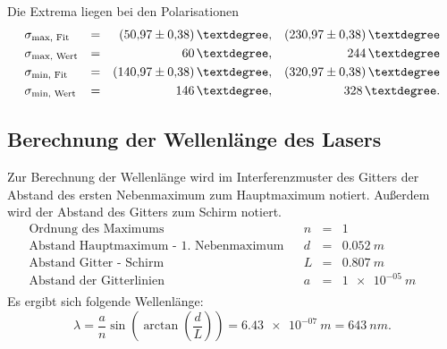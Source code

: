 %
Die Extrema liegen bei den Polarisationen
\begin{align*}
  &\sigma_{\text{max, Fit}} &=&& \SI{50.97 \pm 0.38}{°},   && \SI{230.97 \pm 0.38}{°} \\
  &\sigma_{\text{max, Wert}} &=&& \SI{ 60 }{°},                          && \SI{ 244 }{°} \\
  &\sigma_{\text{min, Fit}} &=&& \SI{140.97 \pm 0.38}{°},  && \SI{320.97 \pm 0.38}{°} \\
  &\sigma_{\text{min, Wert}} &=&& \SI{ 146 }{°},                         && \SI{ 328 }{°}. \\
\end{align*}
\FloatBarrier

\subsection{Berechnung der Wellenlänge des Lasers}
Zur Berechnung der Wellenlänge wird im Interferenzmuster des Gitters der Abstand des ersten Nebenmaximum zum Hauptmaximum notiert.
Außerdem wird der Abstand des Gitters zum Schirm notiert.
\begin{align*}
\text{Ordnung des Maximums}                        && n &=&\SI{1}{}&&\\
\text{Abstand Hauptmaximum - 1. Nebenmaximum}      && d &=&\SI{0.052}{m} && \\
\text{Abstand Gitter - Schirm}                     && L &=&\SI{0.807}{m} && \\
\text{Abstand der Gitterlinien}                    && a &=&\SI{1e-05}{m} && \\
\end{align*}
Es ergibt sich folgende Wellenlänge:
\begin{equation*}
    \lambda = \frac{a}{n} \sin{\left( \arctan{\left( \frac{d}{L} \right)} \right)} = \SI{6.43e-07}{m} = \SI{643}{nm}.
\end{equation*}
